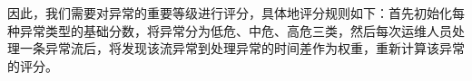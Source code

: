 因此，我们需要对异常的重要等级进行评分，具体地评分规则如下：首先初始化每种异常类型的基础分数，将异常分为低危、中危、高危三类，然后每次运维人员处理一条异常流后，将发现该流异常到处理异常的时间差作为权重，重新计算该异常的评分。












